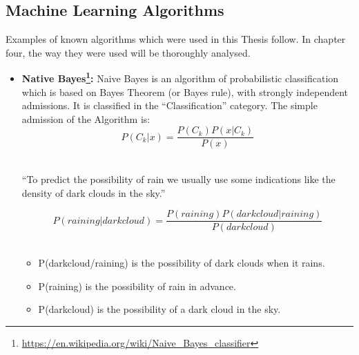 \subsection{Machine Learning Algorithms}\label{212_ref}
Examples of known algorithms which were used in this Thesis follow. In chapter four, the way they were used will be thoroughly analysed.\\
\begin{itemize}
	
	\item \textbf{Native Bayes\footnote{\url{https://en.wikipedia.org/wiki/Naive_Bayes_classifier}}:} Naive Bayes is an algorithm of probabilistic classification which is based on Bayes Theorem (or Bayes rule), with strongly independent admissions. It is classified in the ``Classification'' category. The simple admission of the Algorithm is:\\

\begin{equation}
P\left(C_{k}|x\right)=\frac{P\left(C_{k}\right)P\left(x|C_{k}\right)}{P\left(x\right)}
\end{equation}
\\
\begin{example}
	``To predict the possibility of rain we usually use some indications like the density of dark clouds in the sky.''\\
\end{example}

\begin{equation}
P\left(raining|darkcloud\right)=\frac{P\left(raining\right)P\left(darkcloud|raining\right)}{P\left(darkcloud\right)}
\end{equation}
\\
\begin{itemize}

	\item P(darkcloud/raining) is the possibility of dark clouds when it rains.
	\item P(raining) is the possibility of rain in advance.
	\item P(darkcloud) is the possibility of a dark cloud in the sky.\\

\end{itemize}



\end{itemize}
